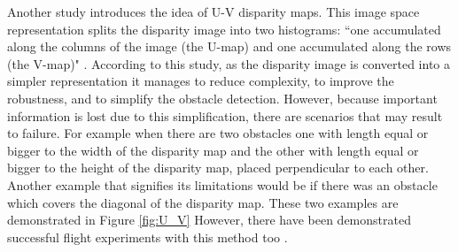 Another study introduces the idea of U-V disparity maps. This image space representation splits the disparity image into two histograms: ``one accumulated along the columns of the image (the U-map) and one accumulated along the rows (the V-map)" \cite{Flata}. According to this study, as the disparity image is converted into a simpler representation it manages to reduce complexity, to improve the robustness, and to simplify the obstacle detection. However, because important information is lost due to this simplification,  there are scenarios that may result to failure. For example when there are two obstacles one with length equal or bigger to the width of the disparity map and the other with length equal or bigger to the height of the disparity map, placed perpendicular to each other. Another example that signifies its limitations would be if there was an obstacle which covers the diagonal of the disparity map. These two examples are demonstrated in Figure \ref{fig:U_V} However, there have been demonstrated successful flight experiments with this method too \cite{Oleynikova2015a}.

\fboxsep=1mm%
\fboxrule=4pt%

